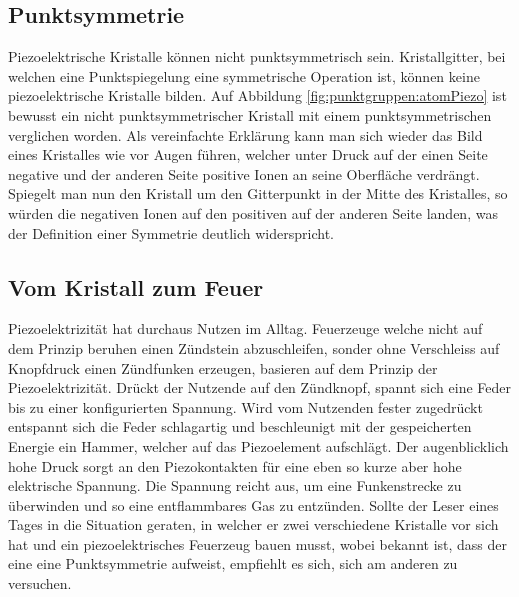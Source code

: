 \subsection{Punktsymmetrie}
Piezoelektrische Kristalle können nicht punktsymmetrisch sein.
Kristallgitter, bei welchen eine Punktspiegelung eine symmetrische Operation ist, können keine piezoelektrische Kristalle bilden.
Auf Abbildung \ref{fig:punktgruppen:atomPiezo} ist bewusst  ein nicht punktsymmetrischer Kristall 
mit einem punktsymmetrischen  verglichen worden.
Als vereinfachte Erklärung kann man sich wieder das Bild eines Kristalles wie  vor Augen führen, 
welcher unter Druck auf der einen Seite negative und der anderen Seite positive Ionen an seine Oberfläche verdrängt.
Spiegelt man nun den Kristall um den Gitterpunkt in der Mitte des Kristalles, so würden die negativen Ionen auf den positiven auf der anderen Seite landen,
was der Definition einer Symmetrie deutlich widerspricht.

\subsection{Vom Kristall zum Feuer}
Piezoelektrizität hat durchaus Nutzen im Alltag.
Feuerzeuge welche nicht auf dem Prinzip beruhen einen Zündstein abzuschleifen, 
sonder ohne Verschleiss auf Knopfdruck einen Zündfunken erzeugen, basieren auf dem Prinzip der Piezoelektrizität.
Drückt der Nutzende auf den Zündknopf, spannt sich eine Feder bis zu einer konfigurierten Spannung.
Wird vom Nutzenden fester zugedrückt entspannt sich die Feder schlagartig und beschleunigt mit der gespeicherten Energie ein Hammer,
welcher auf das Piezoelement aufschlägt.
Der augenblicklich hohe Druck sorgt an den Piezokontakten für eine eben so kurze aber hohe elektrische Spannung.
Die Spannung reicht aus, um eine Funkenstrecke zu überwinden und so eine entflammbares Gas zu entzünden.
Sollte der Leser eines Tages in die Situation geraten, in welcher er zwei verschiedene Kristalle vor sich hat und ein piezoelektrisches Feuerzeug bauen musst, wobei bekannt ist, dass der eine eine Punktsymmetrie aufweist, empfiehlt es sich, sich am anderen zu versuchen.

